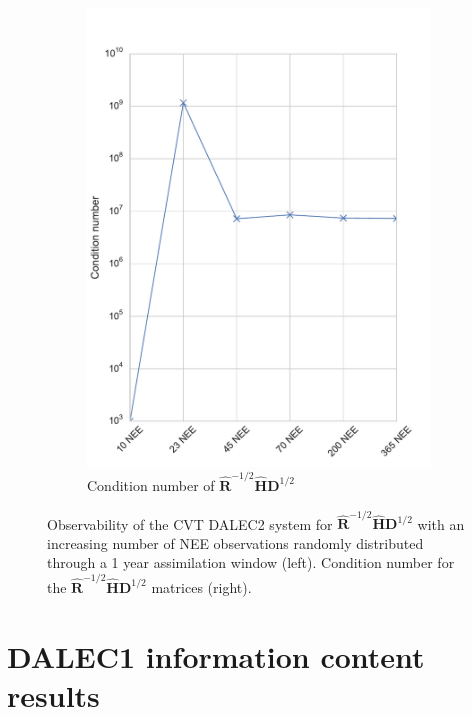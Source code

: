 \begin{figure}[ht]
\begin{subfigure}[b]{0.4\textwidth}
        \includegraphics[width=\textwidth]{chapter/chapter5/dalec2_obsrankcondcvtwind.pdf}
        \caption{Condition number of $\hat{\textbf{R}}^{-1/2}\hat{\textbf{H}}\textbf{D}^{1/2}$}
        \label{chap5:fig:D2_observabilitycondcvtwind}
    \end{subfigure}
    \caption{Observability of the CVT DALEC2 system for $\hat{\textbf{R}}^{-1/2}\hat{\textbf{H}}\textbf{D}^{1/2}$ with an increasing number of NEE observations randomly distributed through a 1 year assimilation window (left). Condition number for the $\hat{\textbf{R}}^{-1/2}\hat{\textbf{H}}\textbf{D}^{1/2}$ matrices (right).}
    \label{chap5:fig:D2_cvtobservabilitywind}
\end{figure}

\section{DALEC1 information content results} \label{chap5:sec:D1_IC} %
